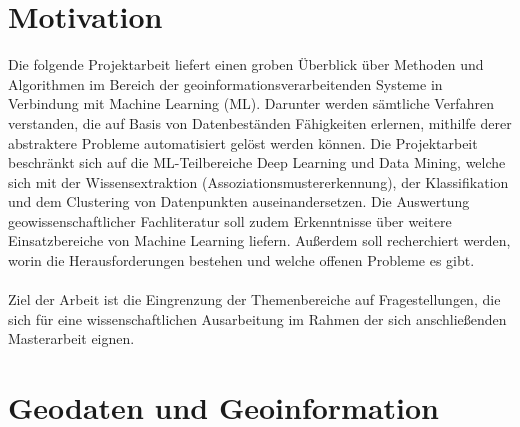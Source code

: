 \documentclass[11pt,ceqn]{book}
\begin{document}
\chapter{Motivation}
Die folgende Projektarbeit liefert einen groben Überblick über Methoden und Algorithmen im Bereich der geoinformationsverarbeitenden Systeme in Verbindung mit Machine Learning (ML). Darunter werden sämtliche Verfahren verstanden, die auf Basis von Datenbeständen Fähigkeiten erlernen, mithilfe derer abstraktere Probleme automatisiert gelöst werden können. Die Projektarbeit beschränkt sich auf die ML-Teilbereiche Deep Learning und Data Mining, welche sich mit der Wissensextraktion (Assoziationsmustererkennung), der Klassifikation und dem Clustering von Datenpunkten auseinandersetzen. Die Auswertung geowissenschaftlicher Fachliteratur soll zudem Erkenntnisse über weitere Einsatzbereiche von Machine Learning liefern. Außerdem soll recherchiert werden, worin die Herausforderungen bestehen und welche offenen Probleme es gibt.
\\~\\
Ziel der Arbeit ist die Eingrenzung der Themenbereiche auf Fragestellungen, die sich für eine wissenschaftlichen Ausarbeitung im Rahmen der sich anschließenden Masterarbeit eignen.

\chapter{Geodaten und Geoinformation}
\end{document}
